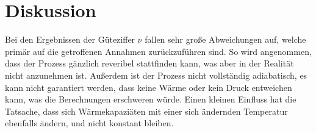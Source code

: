 \section{Diskussion}
\label{sec:Diskussion}


Bei den Ergebnissen der Güteziffer $\nu$ fallen sehr große Abweichungen auf, welche primär auf die getroffenen Annahmen zurückzuführen sind.
So wird angenommen, dass der Prozess gänzlich reveribel stattfinden kann, was aber in der Realität nicht anzunehmen ist.
Außerdem ist der Prozess nicht vollständig adiabatisch, es kann nicht garantiert werden, dass keine Wärme oder kein Druck entweichen kann, was die Berechnungen erschweren würde.
Einen kleinen Einfluss hat die Tatsache, dass sich Wärmekapaziäten mit einer sich ändernden Temperatur ebenfalls ändern, und nicht konstant bleiben.
